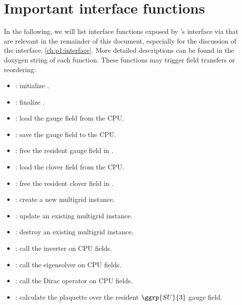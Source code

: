 
\section{Important interface functions}
\label{sec:quda:interface}

In the following, we will list interface functions exposed by \quda's interface via  that are relevant in the remainder of this document, especially for the discussion of the interface, \cref{ch:p1:interface}.
More detailed descriptions can be found in the doxygen string of each function.
These functions may trigger field transfers or reordering:

\begin{itemize}
  \item {}: initialize \quda.
  \item {}: finalize \quda.
  \item {}: load the gauge field from the CPU.
  \item {}: save the gauge field to the CPU.
  \item {}: free the resident gauge field in \quda.
  \item {}: load the clover field from the CPU.
  \item {}: free the resident clover field in \quda.
  \item {}: create a new multigrid instance.
  \item {}: update an existing multigrid instance.
  \item {}: destroy an existing multigrid instance.
  \item {}: call the inverter on CPU fields.
  \item {}: call the eigensolver on CPU fields.
  \item {}: call the Dirac operator on CPU fields.
  \item {}: calculate the plaquette over the resident $\ggrp{SU}{3}$ gauge field.
\end{itemize} 

